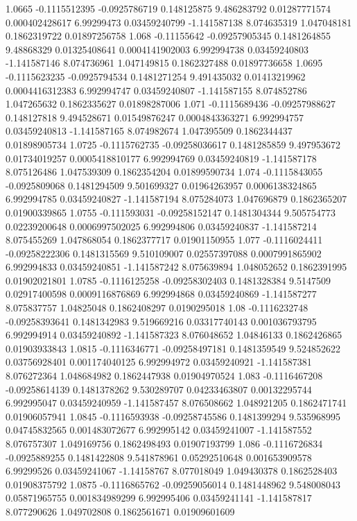 {1.0665 -0.1115512395 -0.0925786719 0.148125875 9.486283792 0.01287771574 0.000402428617 6.99299473 0.03459240799 -1.141587138 8.074635319 1.047048181 0.1862319722 0.01897256758
1.068 -0.11155642 -0.09257905345 0.1481264855 9.48868329 0.01325408641 0.0004141902003 6.992994738 0.03459240803 -1.141587146 8.074736961 1.047149815 0.1862327488 0.01897736658
1.0695 -0.1115623235 -0.0925794534 0.1481271254 9.491435032 0.01413219962 0.0004416312383 6.992994747 0.03459240807 -1.141587155 8.074852786 1.047265632 0.1862335627 0.01898287006
1.071 -0.1115689436 -0.09257988627 0.148127818 9.494528671 0.01549876247 0.0004843363271 6.992994757 0.03459240813 -1.141587165 8.074982674 1.047395509 0.1862344437 0.01898905734
1.0725 -0.1115762735 -0.09258036617 0.1481285859 9.497953672 0.01734019257 0.0005418810177 6.992994769 0.03459240819 -1.141587178 8.075126486 1.047539309 0.1862354204 0.01899590734
1.074 -0.1115843055 -0.0925809068 0.1481294509 9.501699327 0.01964263957 0.0006138324865 6.992994785 0.03459240827 -1.141587194 8.075284073 1.047696879 0.1862365207 0.01900339865
1.0755 -0.111593031 -0.09258152147 0.1481304344 9.505754773 0.02239200648 0.0006997502025 6.992994806 0.03459240837 -1.141587214 8.075455269 1.047868054 0.1862377717 0.01901150955
1.077 -0.1116024411 -0.09258222306 0.1481315569 9.510109007 0.02557397088 0.0007991865902 6.992994833 0.03459240851 -1.141587242 8.075639894 1.048052652 0.1862391995 0.01902021801
1.0785 -0.1116125258 -0.09258302403 0.1481328384 9.5147509 0.02917400598 0.0009116876869 6.992994868 0.03459240869 -1.141587277 8.075837757 1.04825048 0.1862408297 0.0190295018
1.08 -0.1116232748 -0.09258393641 0.1481342983 9.519669216 0.03317740143 0.001036793795 6.992994914 0.03459240892 -1.141587323 8.076048652 1.04846133 0.1862426865 0.01903933843
1.0815 -0.1116346771 -0.09258497181 0.1481359549 9.524852622 0.03756928401 0.001174040125 6.992994972 0.03459240921 -1.141587381 8.076272364 1.048684982 0.1862447938 0.01904970524
1.083 -0.1116467208 -0.09258614139 0.1481378262 9.530289707 0.04233463807 0.00132295744 6.992995047 0.03459240959 -1.141587457 8.076508662 1.048921205 0.1862471741 0.01906057941
1.0845 -0.1116593938 -0.09258745586 0.1481399294 9.535968995 0.04745832565 0.001483072677 6.992995142 0.03459241007 -1.141587552 8.076757307 1.049169756 0.1862498493 0.01907193799
1.086 -0.1116726834 -0.0925889255 0.1481422808 9.541878961 0.05292510648 0.001653909578 6.99299526 0.03459241067 -1.14158767 8.077018049 1.049430378 0.1862528403 0.01908375792
1.0875 -0.1116865762 -0.09259056014 0.1481448962 9.548008043 0.05871965755 0.001834989299 6.992995406 0.03459241141 -1.141587817 8.077290626 1.049702808 0.1862561671 0.01909601609
}
